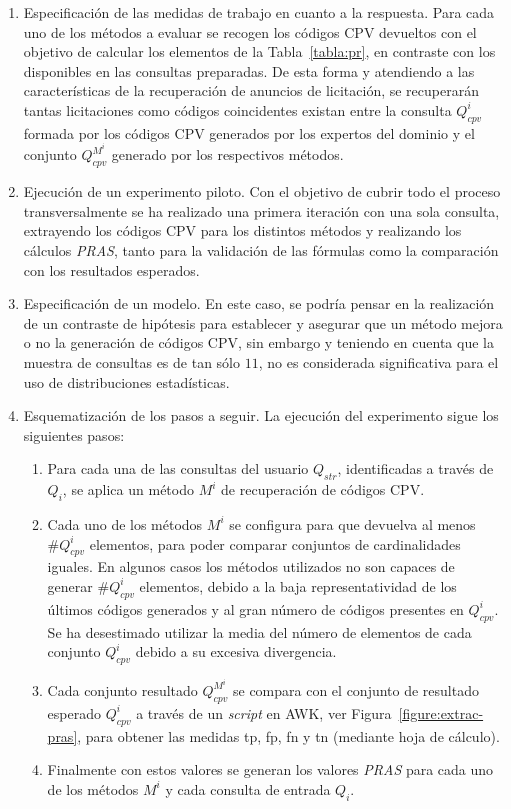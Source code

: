 \begin{enumerate}
 \item Especificación de las medidas de trabajo en cuanto a la respuesta. Para cada uno de los métodos a evaluar se recogen los códigos 
CPV devueltos con el objetivo de calcular los elementos de la Tabla~\ref{tabla:pr}, en contraste con los disponibles en las 
consultas preparadas. De esta forma y atendiendo a las características de la recuperación de anuncios de licitación, se 
recuperarán tantas licitaciones como códigos coincidentes existan entre la consulta $Q^{i}_{cpv}$ formada por los códigos 
CPV generados por los expertos del dominio y el conjunto $Q^{M^i}_{cpv}$ generado por los respectivos métodos.

 \item Ejecución de un experimento piloto. Con el objetivo de cubrir todo el proceso transversalmente se ha realizado una primera iteración 
con una sola consulta, extrayendo los códigos CPV para los distintos métodos y realizando los cálculos \textit{PRAS}, tanto para 
la validación de las fórmulas como la comparación con los resultados esperados.

 \item Especificación de un modelo. En este caso, se podría pensar en la realización de un contraste de hipótesis para establecer 
y asegurar que un método mejora o no la generación de códigos CPV, sin embargo y teniendo en cuenta que la muestra de consultas 
es de tan sólo $11$, no es considerada significativa para el uso de distribuciones estadísticas.
 \item Esquematización de los pasos a seguir. La ejecución del experimento sigue los siguientes pasos:
\begin{enumerate}
 \item Para cada una de las consultas del usuario $Q_{str}$, identificadas a través de $Q_{i}$, se aplica 
un método $M^{i}$ de recuperación de códigos CPV.
\item Cada uno de los métodos $M^{i}$ se configura para que devuelva al menos $\#Q^{i}_{cpv}$ elementos, para poder comparar conjuntos de cardinalidades iguales. En algunos casos los métodos utilizados no son capaces 
de generar $\#Q^{i}_{cpv}$ elementos, debido a la baja representatividad de los últimos códigos generados y al gran número de 
códigos presentes en $Q^{i}_{cpv}$. Se ha desestimado utilizar la media del número de elementos de cada 
conjunto $Q^{i}_{cpv}$ debido a su excesiva divergencia.
\item Cada conjunto resultado $Q^{M^i}_{cpv}$ se compara con el conjunto de resultado esperado $Q^{i}_{cpv}$ a través de un \textit{script} en 
AWK, ver Figura~\ref{figure:extrac-pras}, para obtener las medidas tp, fp, fn y tn (mediante hoja de cálculo).
\item Finalmente con estos valores se generan los valores \textit{PRAS} para cada uno de los métodos $M^{i}$ y cada 
consulta de entrada $Q_{i}$.


\end{enumerate}
\end{enumerate}
